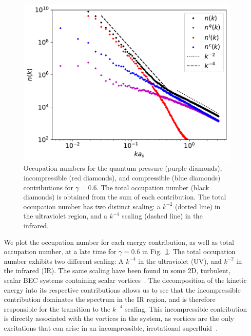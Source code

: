 \begin{figure}[t!]
    \centering
    \includegraphics[scale=0.75]{gfx/ch-twoCompDynamics/spectra.pdf}
    \caption[Occupation numbers for quantum pressure, incompressible and
        compressible contributions]
    {Occupation numbers for the quantum pressure (purple diamonds),
        incompressible (red diamonds), and compressible (blue diamonds)
        contributions for \(\gamma=0.6\).
        The total occupation number (black diamonds) is obtained from the sum of
        each contribution.
        The total occupation number has two distinct scaling: a \(k^{-2}\)
        (dotted line) in the ultraviolet region, and a \(k^{-4}\) scaling
        (dashed line) in the infrared.\label{fig:kinetic-energy-spectra}}
\end{figure}
We plot the occupation number for each energy contribution, as well as total
occupation number, at a late time for \(\gamma=0.6\) in
Fig.~\ref{fig:kinetic-energy-spectra}.
The total occupation number exhibits two different scaling: A \(k^{-4}\) in the
ultraviolet (UV), and \(k^{-2}\) in the infrared (IR).
The same scaling have been found in some 2D, turbulent, scalar BEC systems
containing scalar vortices~\cite{Nowak2012}.
The decomposition of the kinetic energy into its respective contributions
allows us to see that the incompressible contribution dominates the spectrum
in the IR region, and is therefore responsible for the transition to the
\(k^{-4}\) scaling.
This incompressible contribution is directly associated with the vortices in
the system, as vortices are the only excitations that can arise in an
incompressible, irrotational superfluid~\cite{Pethick2008,Barenghi2016}.
